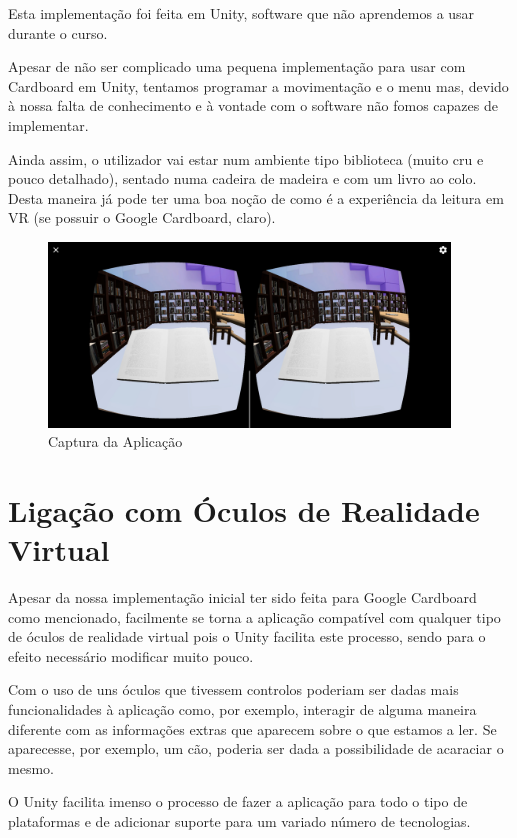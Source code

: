 \documentclass[11pt]{article}
\begin{document}
	Esta implementação foi feita em Unity, software que não aprendemos a usar durante o curso.
	
	Apesar de não ser complicado uma pequena implementação para usar com Cardboard em Unity, tentamos programar a movimentação e o menu mas, devido à nossa falta de conhecimento e à vontade com o software não fomos capazes de implementar.
	
	Ainda assim, o utilizador vai estar num ambiente tipo biblioteca (muito cru e pouco detalhado), sentado numa cadeira de madeira e com um livro ao colo. Desta maneira já pode ter uma boa noção de como é a experiência da leitura em VR (se possuir o Google Cardboard, claro).
	
	\begin{figure}[H]
		\includegraphics[width=0.95\textwidth,height=0.88\textheight,keepaspectratio]{print-app}
		\centering
		\caption{Captura da Aplicação}
		\label{fig:print-app}
	\end{figure}
	
	
	\large
	\section{Ligação com Óculos de Realidade Virtual}
	\normalsize
	
	Apesar da nossa implementação inicial ter sido feita para Google Cardboard como mencionado, facilmente se torna a aplicação compatível com qualquer tipo de óculos de realidade virtual pois o Unity facilita este processo, sendo para o efeito necessário modificar muito pouco.
	
	Com o uso de uns óculos que tivessem controlos poderiam ser dadas mais funcionalidades à aplicação como, por exemplo, interagir de alguma maneira diferente com as informações extras que aparecem sobre o que estamos a ler. Se aparecesse, por exemplo, um cão, poderia ser dada a possibilidade de acaraciar o mesmo.
	
	O Unity facilita imenso o processo de fazer a aplicação para todo o tipo de plataformas e de adicionar suporte para um variado número de tecnologias.
\end{document}

